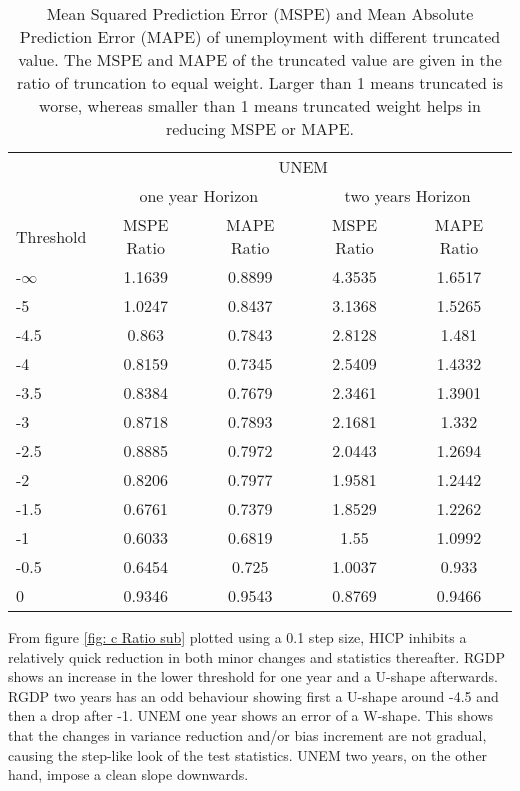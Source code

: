 \documentclass[11pt]{article}
\begin{document}
\begin{table}[!h]
	\centering
	\caption{Mean Squared Prediction Error (MSPE) and Mean Absolute Prediction Error (MAPE) of unemployment with different truncated value. The MSPE and MAPE of the truncated value are given in the ratio of truncation to equal weight. Larger than 1 means truncated is worse, whereas smaller than 1 means truncated weight helps in reducing MSPE or MAPE.}
	\label{tab: c MSPE UNEM}
	\begin{tabular}{lcccc}
		\hline\hline
		&                        \multicolumn{4}{c}{UNEM}                         \\
		\cmidrule(lr){2-5}                              & \multicolumn{2}{c}{one year Horizon} & \multicolumn{2}{c}{two years Horizon} \\
		\cmidrule(lr){2-3} \cmidrule(lr){4-5}
		Threshold & MSPE Ratio &    MAPE Ratio    & MSPE Ratio &    MAPE Ratio    \\ \hline
-$\infty$ & 1.1639 & 0.8899 & 4.3535 & 1.6517\\ 
-5 & 1.0247 & 0.8437 & 3.1368 & 1.5265\\ 
-4.5 & 0.863 & 0.7843 & 2.8128 & 1.481\\ 
-4 & 0.8159 & 0.7345 & 2.5409 & 1.4332\\ 
-3.5 & 0.8384 & 0.7679 & 2.3461 & 1.3901\\ 
-3 & 0.8718 & 0.7893 & 2.1681 & 1.332\\ 
-2.5 & 0.8885 & 0.7972 & 2.0443 & 1.2694\\ 
-2 & 0.8206 & 0.7977 & 1.9581 & 1.2442\\ 
-1.5 & 0.6761 & 0.7379 & 1.8529 & 1.2262\\ 
-1 & 0.6033 & 0.6819 & 1.55 & 1.0992\\ 
-0.5 & 0.6454 & 0.725 & 1.0037 & 0.933\\ 
0 & 0.9346 & 0.9543 & 0.8769 & 0.9466\\ 
		\hline\hline
	\end{tabular}
\end{table}

From figure \ref{fig: c Ratio sub} plotted using a 0.1 step size, HICP inhibits a relatively quick reduction in both minor changes and statistics thereafter. RGDP shows an increase in the lower threshold for one year and a U-shape afterwards. RGDP two years has an odd behaviour showing first a U-shape around -4.5 and then a drop after -1. UNEM one year shows an error of a W-shape. This shows that the changes in variance reduction and/or bias increment are not gradual, causing the step-like look of the test statistics. UNEM two years, on the other hand, impose a clean slope downwards.
\end{document}
